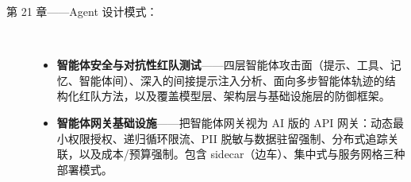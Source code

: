\documentclass[11pt,a4paper,openany]{book}
\begin{document}
\begin{description}
  \item[第 21 章——Agent 设计模式：]~
    \begin{itemize}
      \item \textbf{智能体安全与对抗性红队测试}——四层智能体攻击面（提示、工具、记忆、智能体间）、深入的间接提示注入分析、面向多步智能体轨迹的结构化红队方法，以及覆盖模型层、架构层与基础设施层的防御框架。
      \item \textbf{智能体网关基础设施}——把智能体网关视为 AI 版的 API 网关：动态最小权限授权、递归循环限流、PII 脱敏与数据驻留强制、分布式追踪关联，以及成本/预算强制。包含 sidecar（边车）、集中式与服务网格三种部署模式。
    \end{itemize}


\end{description}
\end{document}
